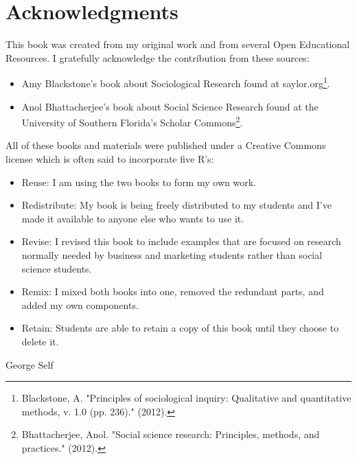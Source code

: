 \chapter*{Acknowledgments}
This book was created from my original work and from several Open Educational Resources. I gratefully acknowledge the contribution from these sources:

%    
%    
%  
%  

\begin{itemize}
	\item Amy Blackstone's book about Sociological Research found at saylor.org\footnote{Blackstone, A. "Principles of sociological inquiry: Qualitative and quantitative methods, v. 1.0 (pp. 236)." (2012).}.
	\item Anol Bhattacherjee's book about Social Science Research found at the University of Southern Florida's Scholar Commons\footnote{Bhattacherjee, Anol. "Social science research: Principles, methods, and practices." (2012).}.
\end{itemize}

All of these books and materials were published under a Creative Commons license which is often said to incorporate five R's:  

\begin{itemize}
	\item Reuse: I am using the two books to form my own work.
	\item Redistribute: My book is being freely distributed to my students and I've made it available to anyone else who wants to use it.
	\item Revise: I revised this book to include examples that are focused on research normally needed by business and marketing students rather than social science students.
	\item Remix: I mixed both books into one, removed the redundant parts, and added my own components.
	\item Retain: Students are able to retain a copy of this book until they choose to delete it.
\end{itemize}


\bigskip
\begin{flushright}
  \textemdash  George Self
\end{flushright}



